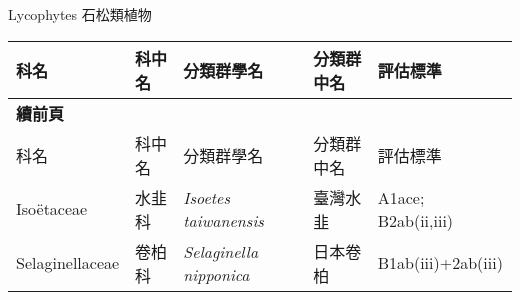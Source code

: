 \noindent\normalfont\selectfont Lycophytes 石松類植物
\footnotesize\selectfont
        {\def\arraystretch{1.5}\tabcolsep=2pt
        \begin{longtable}{p{2.5cm}p{2.5cm}p{4.5cm}p{2.5cm}p{3cm}}
        \toprule
          科名 & 科中名 & 分類群學名 & 分類群中名 & 評估標準 \\
        \midrule 
        \endfirsthead

        {{\bfseries 續前頁 }} \\
        科名 & 科中名 & 分類群學名 & 分類群中名 & 評估標準 \\
        \midrule
        \endhead
                Isoëtaceae & 水韭科 & \textit{Isoetes taiwanensis}  & 臺灣水韭 & A1ace; B2ab(ii,iii) \index{Isoetes@\textit{Isoetes}!taiwanensis@\textit{taiwanensis}}  \index{臺灣水韭} \\
    Selaginellaceae & 卷柏科 & \textit{Selaginella nipponica}  & 日本卷柏 & B1ab(iii)+2ab(iii) \index{Selaginella@\textit{Selaginella}!nipponica@\textit{nipponica}}  \index{日本卷柏} \\
    \bottomrule
        \end{longtable}
        }
    
